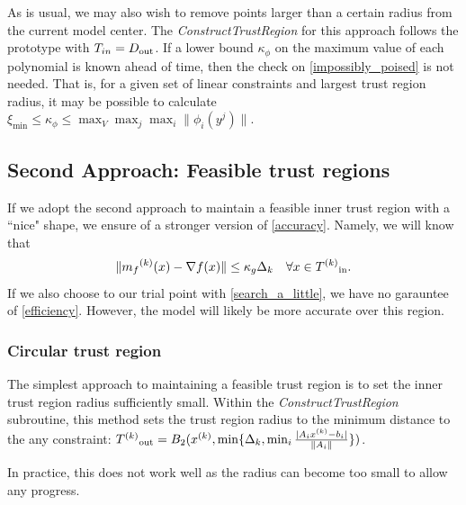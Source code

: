 As is usual, we may also wish to remove points larger than a certain radius from the current model center.
The \emph{ConstructTrustRegion} for this approach follows the prototype with $T_{in} = D_{\text{out}}$.
If a lower bound $\kappa_{\phi}$ on the maximum value of each polynomial is known ahead of time, then the check on \ref{impossibly_poised} is not needed.
That is, for a given set of linear constraints and largest trust region radius, it may be possible to calculate $\xi_{\text{min}} \le \kappa_{\phi} \le \max_{V}\max_{j}\max_{i}\|\phi_i(y^j)\|$.






\subsection{Second Approach: Feasible trust regions}

If we adopt the second approach to maintain a feasible inner trust region with a ``nice" shape, we ensure of a stronger version of \ref{accuracy}.
Namely, we will know that 
\[
    \|{{m}_f}^{(k)}(x) - \nabla f(x) \| \le \kappa_g \Delta_{k} \quad \forall x \in {T^{(k)}}_{\text{in}}.
\]
If we also choose to our trial point with \ref{search_a_little}, we have no garauntee of \ref{efficiency}.
However, the model will likely be more accurate over this region.


\subsubsection{Circular trust region}
The simplest approach to maintaining a feasible trust region is to set the inner trust region radius sufficiently small.
Within the \emph{ConstructTrustRegion} subroutine, this method sets the trust region radius to the minimum distance to the any constraint:
${T^{(k)}}_{\text{out}} = B_2({x}^{(k)}, \min\{\Delta_k, \min_{i}\frac{|A_i{x}^{(k)} - b_i|}{\|A_i\|} \})$.

In practice, this does not work well as the radius can become too small to allow any progress.

